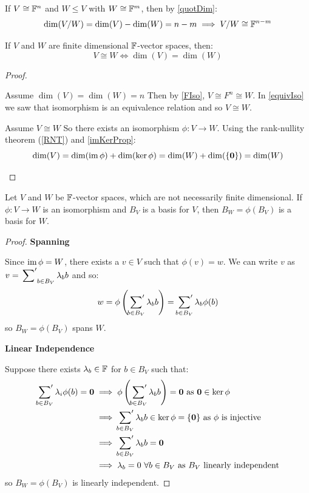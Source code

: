 \documentclass[../main.tex]{subfiles}
\begin{document}
\begin{example}
  If $V \cong \mathbb{F}^n$ and $W \leq V$ with $W \cong \mathbb{F}^m$, then by \cref{quotDim}:
  \[
    \dim(V / W) = \dim(V) - \dim(W) = n - m \implies V / W \cong \mathbb{F}^{n - m}
  \]
\end{example}
\begin{corollary}
  If $V$ and $W$ are finite dimensional $\mathbb{F}$-vector spaces, then: \label{finiteDimIso}
  \[
    V \cong W \iff \dim(V) = \dim(W)
  \]
\end{corollary}
\begin{proof}
  \begin{proofdirection}{Assume $\dim(V) = \dim(W) = n$}
    Then by \cref{FIso}, $V \cong F^n \cong W$.
  In \cref{equivIso} we saw that isomorphism is an equivalence relation and so $V \cong W$.
  \end{proofdirection}
  \begin{proofdirection}{Assume $V \cong W$}
    So there exists an isomorphism $\phi: V \to W$.
    Using the rank-nullity theorem (\cref{RNT}) and \cref{imKerProp}:
    \[
      \dim(V) = \dim(\operatorname{im} \phi) + \dim(\ker \phi) = \dim(W) + \dim(\{\mathbf{\bm{0}}\}) = \dim(W)
    \]
  \end{proofdirection}
\end{proof}
\begin{lemma}
  Let $V$ and $W$ be $\mathbb{F}$-vector spaces, which are not necessarily finite dimensional.
  If $\phi: V \to W$ is an isomorphism and $B_V$ is a basis for $V$, then $B_W = \phi(B_V)$ is a basis for $W$.
\end{lemma}
\begin{proof}\par
    \textbf{Spanning}\par
    Since $\operatorname{im} \phi = W$, there exists a $v \in V$ such that $\phi(v) = w$.
    We can write $v$ as $v = \sideset{}{'}\sum_{b \in B_V} \lambda_b b$ and so:
    \[
      w = \phi\left(\sideset{}{'}\sum_{b \in B_V} \lambda_b b\right) = \sideset{}{'}\sum_{b \in B_V} \lambda_b \phi(b)
    \]
    so $B_W = \phi(B_V)$ spans $W$.

    \textbf{Linear Independence}\par
    Suppose there exists $\lambda_b \in \mathbb{F}$ for $b \in B_V$ such that:
    \begin{align*}
      \sideset{}{'}\sum_{b \in B_V} \lambda_i \phi(b) = \mathbf{\bm{0}} &\implies \phi\left(\sideset{}{'}\sum_{b \in B_V} \lambda_b b\right) = \mathbf{\bm{0}} \text{ as $\mathbf{\bm{0}} \in \ker \phi$} \\
                                                         &\implies \sideset{}{'}\sum_{b \in B_V} \lambda_b b \in \ker \phi = \{\mathbf{\bm{0}}\} \text{ as $\phi$ is injective} \\
                                                         &\implies \sideset{}{'}\sum_{b \in B_V} \lambda_b b = \mathbf{\bm{0}} \\
                                                         &\implies \lambda_b = 0\ \forall b \in B_{V} \text{ as $B_V$ linearly independent}
    \end{align*}
    so $B_W = \phi(B_V)$ is linearly independent.
\end{proof}
\end{document}
